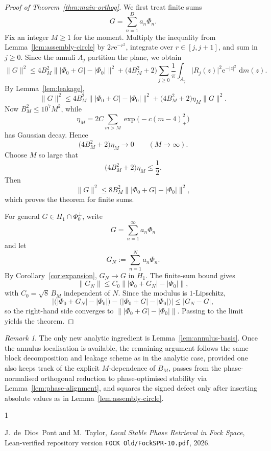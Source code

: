 \documentclass[11pt]{amsart}
\theoremstyle{remark}
\newtheorem{remark}[theorem]{Remark}
\newcommand{\abs}[1]{\lvert #1 \rvert}
\newcommand{\norm}[1]{\lVert #1 \rVert}
\newcommand{\dd}{\,\mathrm{d}}
\newcommand{\ee}{\mathrm{e}}
\begin{document}
\begin{proof}[Proof of Theorem~\ref{thm:main-orthog}]
We first treat finite sums
\[
G = \sum_{n=1}^D a_n \Phi_n.
\]
Fix an integer $M \ge 1$ for the moment. Multiply the inequality from
Lemma~\ref{lem:assembly-circle} by $2r\ee^{-r^2}$, integrate over
$r \in [j,j+1]$, and sum in $j \ge 0$. Since the annuli $A_j$ partition the
plane, we obtain
\[
\norm{G}^2
\le
4B_M^2 \norm{\abs{\Phi_0 + G} - \abs{\Phi_0}}^2
+
\bigl(4B_M^2 + 2\bigr)
\sum_{j\ge0}
\frac1\pi \int_{A_j} \abs{R_j(z)}^2 \ee^{-\abs{z}^2}\,\dd m(z).
\]
By Lemma~\ref{lem:leakage},
\[
\norm{G}^2
\le
4B_M^2 \norm{\abs{\Phi_0 + G} - \abs{\Phi_0}}^2
+
\bigl(4B_M^2 + 2\bigr)\eta_M \norm{G}^2.
\]
Now $B_M^2 \le 10^7 M^2$, while
\[
\eta_M = 2C \sum_{m>M} \exp\!\bigl(-c(m-4)_+^2\bigr)
\]
has Gaussian decay. Hence
\[
\bigl(4B_M^2 + 2\bigr)\eta_M \longrightarrow 0
\qquad
(M\to\infty).
\]
Choose $M$ so large that
\[
\bigl(4B_M^2 + 2\bigr)\eta_M \le \frac12.
\]
Then
\[
\norm{G}^2
\le
8B_M^2 \norm{\abs{\Phi_0 + G} - \abs{\Phi_0}}^2,
\]
which proves the theorem for finite sums.

For general $G \in H_1 \cap \Phi_0^\perp$, write
\[
G = \sum_{n=1}^\infty a_n \Phi_n
\]
and let
\[
G_N := \sum_{n=1}^N a_n \Phi_n.
\]
By Corollary~\ref{cor:expansion}, $G_N \to G$ in $H_1$. The finite-sum bound
gives
\[
\norm{G_N}
\le
C_0 \norm{\abs{\Phi_0 + G_N} - \abs{\Phi_0}},
\]
with $C_0 = \sqrt{8}\,B_M$ independent of $N$. Since the modulus is
$1$-Lipschitz,
\[
\abs{\bigl(\abs{\Phi_0 + G_N} - \abs{\Phi_0}\bigr)
-
\bigl(\abs{\Phi_0 + G} - \abs{\Phi_0}\bigr)}
\le
\abs{G_N - G},
\]
so the right-hand side converges to
$\norm{\abs{\Phi_0 + G} - \abs{\Phi_0}}$. Passing to the limit yields the
theorem.
\end{proof}

\begin{remark}
The only new analytic ingredient is Lemma~\ref{lem:annulus-basis}. Once the
annulus localisation is available, the remaining argument follows the same
block decomposition and leakage scheme as in the analytic case, provided one
also keeps track of the explicit $M$-dependence of $B_M$, passes from the
phase-normalised orthogonal reduction to phase-optimised stability via
Lemma~\ref{lem:phase-alignment}, and squares the signed defect only after
inserting absolute values as in Lemma~\ref{lem:assembly-circle}.
\end{remark}

\begin{thebibliography}{1}

J.~de~Dios~Pont and M.~Taylor,
\emph{Local Stable Phase Retrieval in Fock Space},
Lean-verified repository version \texttt{FOCK Old/FockSPR-10.pdf}, 2026.

\end{thebibliography}
\end{document}
